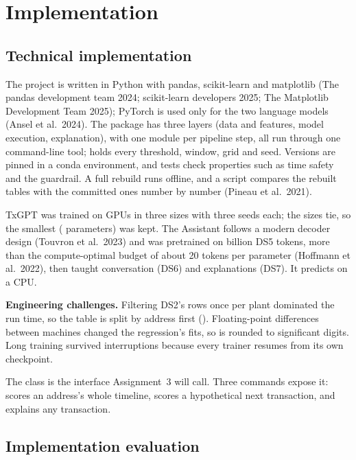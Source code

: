 \section{Implementation}

\subsection{Technical implementation}
\label{sec:technical}

The project is written in Python with pandas, scikit-learn and matplotlib (The pandas
development team 2024; scikit-learn developers 2025; The Matplotlib Development Team 2025); PyTorch is used only
for the two language models (Ansel et al.\ 2024). The  package has three layers (data and features,
model execution, explanation), with one module per pipeline step, all run through one command-line tool;
 holds every threshold, window, grid and seed. Versions are pinned in a conda environment, and  tests check properties such as time
safety and the guardrail. A full rebuild runs offline, and a script compares the rebuilt tables with the committed
ones number by number (Pineau et al.\ 2021).

TxGPT was trained on GPUs in three sizes with three seeds each; the sizes tie, so the smallest
( parameters) was kept. The Assistant follows a modern decoder design (Touvron et al.\ 2023) and was
pretrained on  billion DS5 tokens, more than the compute-optimal budget of about 20 tokens per
parameter (Hoffmann et al.\ 2022), then taught conversation (DS6) and explanations (DS7). It predicts on a CPU.

\textbf{Engineering challenges.} Filtering DS2's rows once per plant dominated the run time, so the table is split by
address first (). Floating-point differences between machines changed the regression's fits,
so  is rounded to  significant digits. Long training survived interruptions
because every trainer resumes from its own checkpoint.

The  class is the interface Assignment~3 will call. Three commands expose it: 
scores an address's whole timeline,  scores a hypothetical next transaction, and
 explains any transaction.

\subsection{Implementation evaluation}
\label{sec:evaluation}

